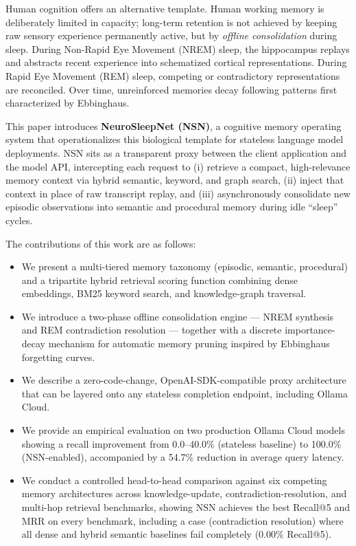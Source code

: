 \documentclass[conference]{IEEEtran}
\begin{document}
Human cognition offers an alternative template. Human working memory is deliberately limited in capacity; long-term retention is not achieved by keeping raw sensory experience permanently active, but by \emph{offline consolidation} during sleep. During Non-Rapid Eye Movement (NREM) sleep, the hippocampus replays and abstracts recent experience into schematized cortical representations. During Rapid Eye Movement (REM) sleep, competing or contradictory representations are reconciled. Over time, unreinforced memories decay following patterns first characterized by Ebbinghaus.

This paper introduces \textbf{NeuroSleepNet (NSN)}, a cognitive memory operating system that operationalizes this biological template for stateless language model deployments. NSN sits as a transparent proxy between the client application and the model API, intercepting each request to (i) retrieve a compact, high-relevance memory context via hybrid semantic, keyword, and graph search, (ii) inject that context in place of raw transcript replay, and (iii) asynchronously consolidate new episodic observations into semantic and procedural memory during idle ``sleep'' cycles.

The contributions of this work are as follows:
\begin{itemize}
    \item We present a multi-tiered memory taxonomy (episodic, semantic, procedural) and a tripartite hybrid retrieval scoring function combining dense embeddings, BM25 keyword search, and knowledge-graph traversal.
    \item We introduce a two-phase offline consolidation engine --- NREM synthesis and REM contradiction resolution --- together with a discrete importance-decay mechanism for automatic memory pruning inspired by Ebbinghaus forgetting curves.
    \item We describe a zero-code-change, OpenAI-SDK-compatible proxy architecture that can be layered onto any stateless completion endpoint, including Ollama Cloud.
    \item We provide an empirical evaluation on two production Ollama Cloud models showing a recall improvement from 0.0--40.0\% (stateless baseline) to 100.0\% (NSN-enabled), accompanied by a 54.7\% reduction in average query latency.
    \item We conduct a controlled head-to-head comparison against six competing memory architectures across knowledge-update, contradiction-resolution, and multi-hop retrieval benchmarks, showing NSN achieves the best Recall@5 and MRR on every benchmark, including a case (contradiction resolution) where all dense and hybrid semantic baselines fail completely (0.00\% Recall@5).
\end{itemize}
\end{document}
